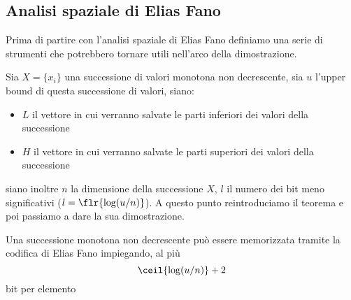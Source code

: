 \subsection{Analisi spaziale di Elias Fano}
Prima di partire con l'analisi spaziale di Elias Fano definiamo una serie di strumenti che potrebbero tornare utili nell'arco della dimostrazione.

Sia $X=\{x_i\}$ una successione di valori monotona non decrescente, sia $u$ l'upper bound di questa successione di valori, siano:
\begin{itemize}
    \item $L$ il vettore in cui verranno salvate le parti inferiori dei valori della successione
    \item $H$ il vettore in cui verranno salvate le parti superiori dei valori della successione
\end{itemize}
siano inoltre $n$ la dimensione della successione $X$, $l$ il numero dei bit meno significativi ($l = \flr{\log(u/n)}$). A questo punto reintroduciamo il teorema e poi passiamo a dare la sua dimostrazione.
\begin{theorem}
    Una successione monotona non decrescente può essere memorizzata tramite la codifica di Elias Fano impiegando, al più
    \begin{equation}
        \ceil{\log(u/n)} + 2
    \end{equation}
    bit per elemento
\end{theorem}
